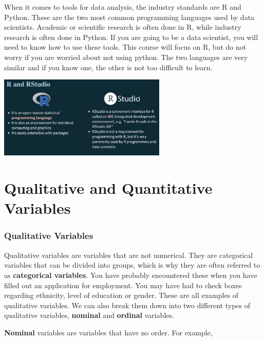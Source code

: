 \documentclass[
  letterpaper,
  DIV=11,
  numbers=noendperiod]{scrreprt}
\begin{document}
When it comes to tools for data analysis, the industry standards are R
and Python. These are the two most common programming languages used by
data scientists. Academic or scientific research is often done in R,
while industry research is often done in Python. If you are going to be
a data scientist, you will need to know how to use these tools. This
course will focus on R, but do not worry if you are worried about not
using python. The two languages are very similar and if you know one,
the other is not too difficult to learn.

\includegraphics[width=0.6\textwidth,height=\textheight]{./images/WIDS-13.jpg}


\chapter*{Qualitative and Quantitative
Variables}\label{qualitative-and-quantitative-variables}


\subsection*{Qualitative Variables}\label{qualitative-variables}

Qualitative variables are variables that are not numerical. They are
categorical variables that can be divided into groups, which is why they
are often referred to as \textbf{categorical variables}. You have
probably encountered these when you have filled out an application for
employment. You may have had to check boxes regarding ethnicity, level
of education or gender. These are all examples of qualitative variables.
We can also break them down into two different types of qualitative
variables, \textbf{nominal} and \textbf{ordinal} variables.

\textbf{Nominal} variables are variables that have no order. For
example,
\end{document}
